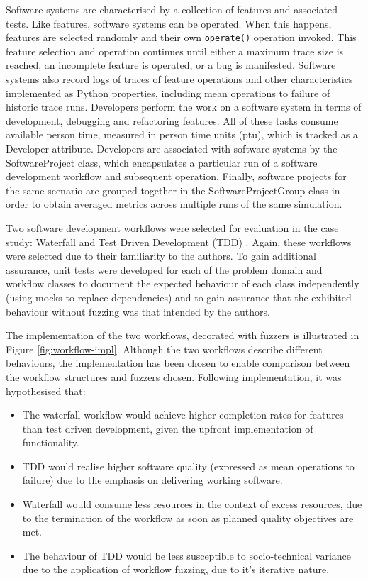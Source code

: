 \documentclass{sig-alternate}
\begin{document}
Software systems are characterised by a collection of features and associated
tests.  Like features, software systems can be operated.  When this happens,
features are selected randomly and their own \lstinline!operate()!  operation
invoked.  This feature selection and operation continues until either a maximum
trace size is reached, an incomplete feature is operated, or a bug is
manifested.  Software systems also record logs of traces of feature operations
and other characteristics implemented as Python properties, including mean
operations to failure of historic trace runs.  Developers perform the work on a
software system in terms of development, debugging and refactoring features.
All of these tasks consume available person time, measured in person time units
(ptu), which is tracked as a Developer attribute.  Developers are associated
with software systems by the SoftwareProject class, which encapsulates a
particular run of a software development workflow and subsequent operation.
Finally, software projects for the same scenario are grouped together in the
SoftwareProjectGroup class in order to obtain averaged metrics across multiple
runs of the same simulation.

Two software development workflows were selected for evaluation in the case
study: Waterfall \citep{benington83production} and Test Driven Development (TDD)
\citep{beck02test}.  Again, these workflows were selected due to their
familiarity to the authors.  To gain additional assurance, unit tests were
developed for each of the problem domain and workflow classes to document the
expected behaviour of each class independently (using mocks to replace
dependencies) and to gain assurance that the exhibited behaviour without fuzzing
was that intended by the authors.

The implementation of the two workflows, decorated with fuzzers is illustrated
in Figure \ref{fig:workflow-impl}.  Although the two workflows describe
different behaviours, the implementation has been chosen to enable comparison
between the workflow structures and fuzzers chosen.  Following implementation,
it was hypothesised that:

\begin{itemize}

\item The waterfall workflow would achieve higher completion rates for features
  than test driven development, given the upfront implementation of
  functionality.

\item TDD would realise higher software quality (expressed as mean operations to
  failure) due to the emphasis on delivering working software.

\item Waterfall would consume less resources in the context of excess resources,
  due to the termination of the workflow as soon as planned quality objectives
  are met.

\item The behaviour of TDD would be less susceptible to socio-technical variance
  due to the application of workflow fuzzing, due to it's iterative nature.

\end{itemize}
\end{document}
